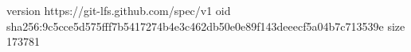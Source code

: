 version https://git-lfs.github.com/spec/v1
oid sha256:9c5cce5d575fff7b5417274b4e3c462db50e0e89f143deeecf5a04b7c713539e
size 173781
